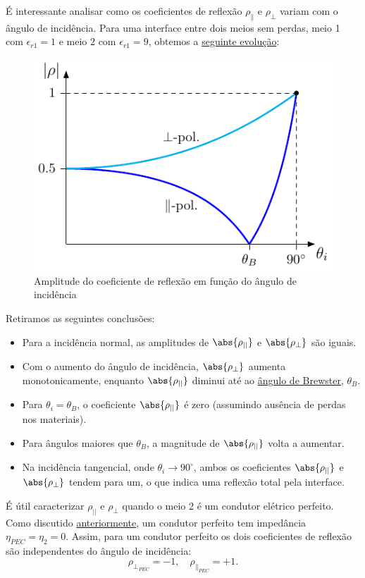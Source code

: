 É interessante analisar como os coeficientes de reflexão $\rho_{\parallel}$ e $\rho_{\perp}$ variam com o ângulo de incidência. Para uma interface entre dois meios sem perdas, meio 1 com $\epsilon_{r1} = 1$ e meio 2 com $\epsilon_{r1} = 9$, obtemos a \hyperref[fig:Reflection-coef-function]{seguinte evolução}:

\begin{figure}[H]
    \centering
    \includegraphics[width=0.5\linewidth]{img/1/Reflection-coef-function.pdf}
    \caption{Amplitude do coeficiente de reflexão em função do ângulo de incidência~\cite{silveirinha2023}}
    \label{fig:Reflection-coef-function}
\end{figure}

Retiramos as seguintes conclusões:
\begin{itemize}
    \item Para a incidência normal, as amplitudes de $\abs{\rho_{||}}$ e $\abs{\rho_{\perp}}$ são iguais.
    \item Com o aumento do ângulo de incidência, $\abs{\rho_{\perp}}$ aumenta monotonicamente, enquanto $\abs{\rho_{||}}$ diminui até ao \underline{ângulo de Brewster}, $\theta_B$.
    \item Para $\theta_i = \theta_B$, o coeficiente $\abs{\rho_{||}}$ é zero (assumindo ausência de perdas nos materiais).
    \item Para ângulos maiores que $\theta_B$, a magnitude de $\abs{\rho_{||}}$ volta a aumentar.
    \item Na incidência tangencial, onde $\theta_i \to 90^\circ$, ambos os coeficientes $\abs{\rho_{||}}$ e $\abs{\rho_{\perp}}$ tendem para um, o que indica uma reflexão total pela interface.
\end{itemize}

\begin{warning}
    É útil caracterizar $\rho_{||}$ e $\rho_{\perp}$ quando o meio 2 é um condutor elétrico perfeito. Como discutido \hyperref[warn:9]{anteriormente}, um condutor perfeito tem impedância $\eta_{PEC} = \eta_2 = 0$. Assim, para um condutor perfeito os dois coeficientes de reflexão são independentes do ângulo de incidência:
    \begin{equation}
        \rho_{\perp_{PEC}} = -1, \quad \rho_{\parallel_{PEC}} = +1.
    \end{equation}
\end{warning}

